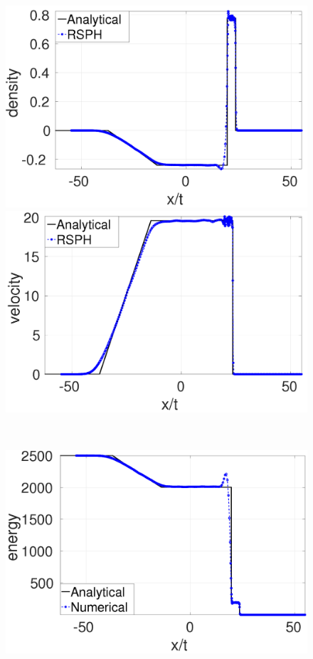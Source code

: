 \documentclass[review]{elsarticle}
\begin{document}
\begin{figure}[H]
    \centering
    \begin{minipage}{.415\textwidth}
        \centering
        \includegraphics[width=0.99 \textwidth]{./Figures/StrBlst-RCM-rho-Rp3}
    \end{minipage}%
    \begin{minipage}{.415 \textwidth}
        \centering
        \includegraphics[width=0.99 \textwidth]{./Figures/StrBlst-RCM-v-Rp3}
    \end{minipage}%
    \\
    \begin{minipage}{.415 \textwidth}
        \centering
        \includegraphics[width=0.99 \textwidth]{./Figures/StrBlst-RCM-e-Rp3}

\end{minipage}
\end{figure}
\end{document}
